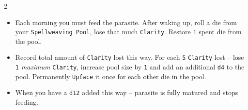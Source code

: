 \begin{multicols*}{2}
\begin{itemize}[nosep, leftmargin=*]
    \item Each morning you must feed the parasite.
    After waking up, roll a die from your \texttt{Spellweaving Pool}, lose that much \texttt{Clarity}.
    Restore \texttt{1} spent die from the pool.
    \item Record total amount of \texttt{Clarity} lost this way.
    For each \texttt{5} \texttt{Clarity} lost -- lose \texttt{1} \textit{maximum} \texttt{Clarity}, increase pool size by \texttt{1} and add an additional \texttt{d4} to the pool.
    Permanently \texttt{Upface} it once for each other die in the pool.
    \item When you have a \texttt{d12} added this way -- parasite is fully matured and stops feeding.

\end{itemize}

\end{multicols*}
